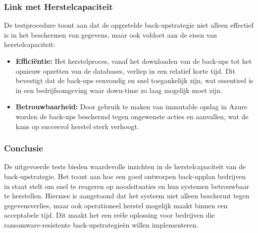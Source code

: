 \subsubsection{Link met Herstelcapaciteit}
De testprocedure toont aan dat de opgestelde back-upstrategie niet alleen effectief is in het beschermen van gegevens, maar ook voldoet aan de eisen van herstelcapaciteit:

\begin{itemize}
    \item \textbf{Efficiëntie:} Het herstelproces, vanaf het downloaden van de back-ups tot het opnieuw opzetten van de databases, verliep in een relatief korte tijd. Dit bevestigt dat de back-ups eenvoudig en snel toegankelijk zijn, wat essentieel is in een bedrijfsomgeving waar down-time zo laag mogelijk moet zijn.
    
    \item \textbf{Betrouwbaarheid:} Door gebruik te maken van immutable opslag in Azure worden de back-ups beschermd tegen ongewenste acties en aanvallen, wat de kans op succesvol herstel sterk verhoogt.
\end{itemize}

\subsubsection{Conclusie}
De uitgevoerde tests bieden waardevolle inzichten in de herstelcapaciteit van de back-upstrategie. Het toont aan hoe een goed ontworpen back-upplan bedrijven in staat stelt om snel te reageren op noodsituaties en hun systemen betrouwbaar te herstellen. Hiermee is aangetoond dat het systeem niet alleen beschermt tegen gegevensverlies, maar ook operationeel herstel mogelijk maakt binnen een acceptabele tijd. Dit maakt het een reële oplossing voor bedrijven die ransomware-resistente back-upstrategieën willen implementeren.
































